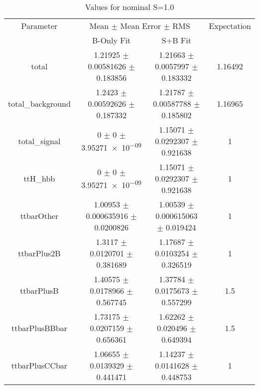 \begin{table}
\centering
\caption{Values for nominal S=1.0}
\begin{tabular}{cccc}
\toprule
Parameter & \multicolumn{2}{c}{Mean $\pm$ Mean Error $\pm$ RMS} & Expectation\\
 & B-Only Fit & S+B Fit & \\
\midrule
total & \num{1.21925} $\pm$ \num{0.00581626} $\pm$ \num{0.183856} & \num{1.21663} $\pm$ \num{0.0057997} $\pm$ \num{0.183332} & \num{1.16492}\\
total\_background & \num{1.2423} $\pm$ \num{0.00592626} $\pm$ \num{0.187332} & \num{1.21787} $\pm$ \num{0.00587788} $\pm$ \num{0.185802} & \num{1.16965}\\
total\_signal & \num{0} $\pm$ \num{0} $\pm$ \num{3.95271e-09} & \num{1.15071} $\pm$ \num{0.0292307} $\pm$ \num{0.921638} & \num{1}\\
ttH\_hbb & \num{0} $\pm$ \num{0} $\pm$ \num{3.95271e-09} & \num{1.15071} $\pm$ \num{0.0292307} $\pm$ \num{0.921638} & \num{1}\\
ttbarOther & \num{1.00953} $\pm$ \num{0.000635916} $\pm$ \num{0.0200826} & \num{1.00539} $\pm$ \num{0.000615063} $\pm$ \num{0.019424} & \num{1}\\
ttbarPlus2B & \num{1.3117} $\pm$ \num{0.0120701} $\pm$ \num{0.381689} & \num{1.17687} $\pm$ \num{0.0103254} $\pm$ \num{0.326519} & \num{1}\\
ttbarPlusB & \num{1.40575} $\pm$ \num{0.0178966} $\pm$ \num{0.567745} & \num{1.37784} $\pm$ \num{0.0175673} $\pm$ \num{0.557299} & \num{1.5}\\
ttbarPlusBBbar & \num{1.73175} $\pm$ \num{0.0207159} $\pm$ \num{0.656361} & \num{1.62262} $\pm$ \num{0.020496} $\pm$ \num{0.649394} & \num{1.5}\\
ttbarPlusCCbar & \num{1.06655} $\pm$ \num{0.0139329} $\pm$ \num{0.441471} & \num{1.14237} $\pm$ \num{0.0141628} $\pm$ \num{0.448753} & \num{1}\\
\bottomrule
\end{tabular}
\end{table}